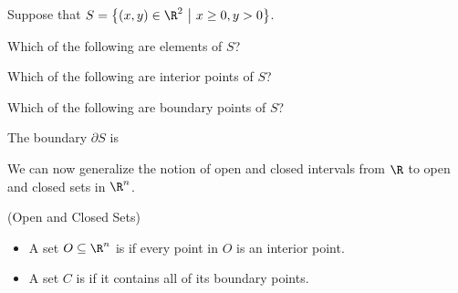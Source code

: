 \documentclass{ximera}
\newcommand{\point}[1]{\left(#1\right)} %
\begin{document}
\begin{question}
Suppose that $S = \left\{ (x,y) \in \R^2 ~ \big| ~ x \geq 0, y > 0\right\}$.

Which of the following are elements of $S$?
\begin{selectAll}
\choice{$\point{0,0}$}
\choice[correct]{$\point{0,2}$}
\choice{$\point{2,0}$}
\choice[correct]{$\point{2,2}$}
\end{selectAll}

Which of the following are interior points of $S$?
\begin{selectAll}
\choice{$\point{0,0}$}
\choice{$\point{0,2}$}
\choice{$\point{2,0}$}
\choice[correct]{$\point{2,2}$}
\end{selectAll}

Which of the following are boundary points of $S$?
\begin{selectAll}
\choice{$\point{0,0}$}
\choice[correct]{$\point{0,2}$}
\choice{$\point{2,0}$}
\choice{$\point{2,2}$}
\end{selectAll}

The boundary $\partial S $  is 
\end{question}

We can now generalize the notion of open and closed intervals from $\R$ to open and closed sets in $\R^n$.

\begin{definition} (Open and Closed Sets)

\begin{itemize}
  \item A set $O \subseteq \R^n$ is  if every point in $O$ is an interior
    point.
    \begin{image}
    \end{image}
  \item A set $C$ is  if it contains all of its boundary
    points.
    \begin{image}
    \end{image}
    
    
\end{itemize}
    
\end{definition}    
    
\end{document}
